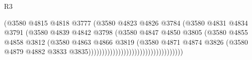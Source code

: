 \begin{lexlean}{R3}
\begin{coremodule}
                                                        (@3580
                                                          @4815
                                                          @4818
                                                          @3777
                                                          (@3580
                                                            @4823
                                                            @4826
                                                            @3784
                                                            (@3580
                                                              @4831
                                                              @4834
                                                              @3791
                                                              (@3580
                                                                @4839
                                                                @4842
                                                                @3798
                                                                (@3580
                                                                  @4847
                                                                  @4850
                                                                  @3805
                                                                  (@3580
                                                                    @4855
                                                                    @4858
                                                                    @3812
                                                                    (@3580
                                                                      @4863
                                                                      @4866
                                                                      @3819
                                                                      (@3580
                                                                        @4871
                                                                        @4874
                                                                        @3826
                                                                        (@3580
                                                                          @4879
                                                                          @4882
                                                                          @3833
                                                                          @3835)))))))))))))))))))))))))))))))))))

\end{coremodule}
\end{lexlean}
